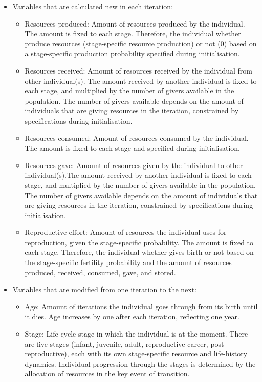 \documentclass{article}
\begin{document}
\begin{itemize}
    \item Variables that are calculated new in each iteration:
    \begin{itemize}
        \item Resources produced: Amount of resources produced by the individual. The amount is fixed to each stage. Therefore, the individual whether produce resources (stage-specific resource production) or not ($0$) based on a stage-specific production probability specified during initialisation.
        \item Resources received: Amount of resources received by the individual from other individual(s). The amount received by another individual is fixed to each stage, and multiplied by the number of givers available in the population. The number of givers available depends on the amount of individuals that are giving resources in the iteration, constrained by specifications during initialisation.
        \item Resources consumed: Amount of resources consumed by the individual. The amount is fixed to each stage and specified during initialisation.
        \item Resources gave: Amount of resources given by the individual to other individual(s).The amount received by another individual is fixed to each stage, and multiplied by the number of givers available in the population. The number of givers available depends on the amount of individuals that are giving resources in the iteration, constrained by specifications during initialisation.
        \item Reproductive effort: Amount of resources the individual uses for reproduction, given the stage-specific probability. The amount is fixed to each stage. Therefore, the individual whether gives birth or not based on the stage-specific fertility probability and the amount of resources produced, received, consumed, gave, and stored.
    \end{itemize}
    \item Variables that are modified from one iteration to the next:
    \begin{itemize}
        \item Age: Amount of iterations the individual goes through from its birth until it dies. Age increases by one after each iteration, reflecting one year.
        \item Stage: Life cycle stage in which the individual is at the moment. There are five stages (infant, juvenile, adult, reproductive-career, post-reproductive), each with its own stage-specific resource and life-history dynamics. Individual progression through the stages is determined by the allocation of resources in the key event of transition.

\end{itemize}
\end{itemize}
\end{document}
